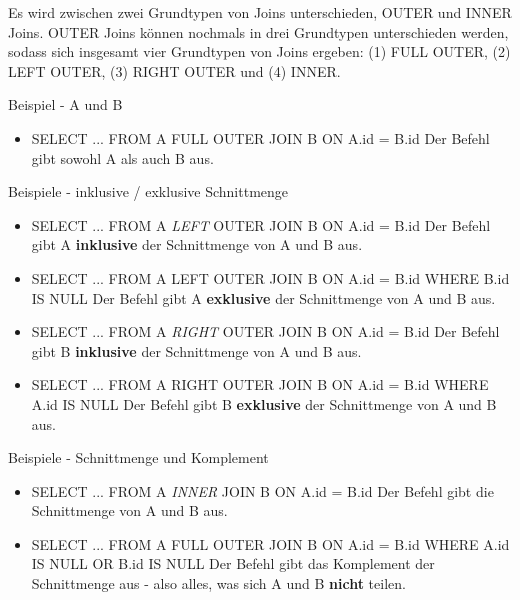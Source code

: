 Es wird zwischen zwei Grundtypen von Joins unterschieden, OUTER und INNER Joins. OUTER Joins können nochmals in drei Grundtypen unterschieden werden, sodass sich insgesamt vier Grundtypen von Joins ergeben: (1) FULL OUTER, (2) LEFT OUTER, (3) RIGHT OUTER und (4) INNER. 

Beispiel - A und B
\begin{itemize}
	\item SELECT ... FROM A FULL OUTER JOIN B ON A.id = B.id
	Der Befehl gibt sowohl A als auch B aus.
\end{itemize}

Beispiele - inklusive / exklusive Schnittmenge
\begin{itemize}
	\item SELECT ... FROM A {\it LEFT} OUTER JOIN B ON A.id = B.id
	Der Befehl gibt A {\bf inklusive} der Schnittmenge von A und B aus.
	\item SELECT ... FROM A LEFT OUTER JOIN B ON A.id = B.id WHERE B.id IS NULL
	Der Befehl gibt A {\bf exklusive} der Schnittmenge von A und B aus.
	\item SELECT ... FROM A {\it RIGHT} OUTER JOIN B ON A.id = B.id
	Der Befehl gibt B {\bf inklusive} der Schnittmenge von A und B aus.
	\item SELECT ... FROM A RIGHT OUTER JOIN B ON A.id = B.id WHERE A.id IS NULL
	Der Befehl gibt B {\bf exklusive} der Schnittmenge von A und B aus.
\end{itemize}

Beispiele - Schnittmenge und Komplement
\begin{itemize}
	\item SELECT ... FROM A {\it INNER} JOIN B ON A.id = B.id
	Der Befehl gibt die Schnittmenge von A und B aus.
	\item SELECT ... FROM A FULL OUTER JOIN B ON A.id = B.id WHERE A.id IS NULL OR B.id IS NULL
	Der Befehl gibt das Komplement der Schnittmenge aus - also alles, was sich A und B {\bf nicht} teilen.
\end{itemize}



